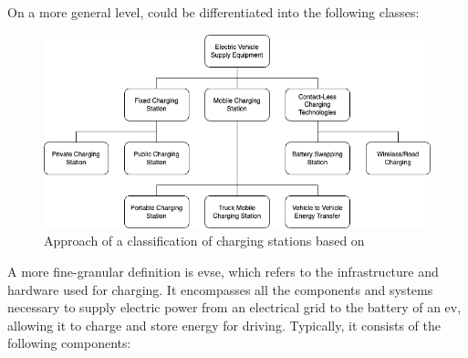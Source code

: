 On a more general level,  could be differentiated into the following classes:

\begin{figure}[!ht]
    \centering
    \includegraphics[scale=0.4]{resources/images/main/1_fundamentals/ChargingStationClassification.png}
    \caption{Approach of a classification of charging stations based on \cite{afshar_literature_2020}}
    \label{fig:enter-label}
\end{figure}

A more fine-granular definition is \acrfull{evse}, which refers to the infrastructure and hardware used for charging. It encompasses all the components and systems necessary to supply electric power from an electrical grid to the battery of an \acrfull{ev}, allowing it to charge and store energy for driving. Typically, it consists of the following components:

